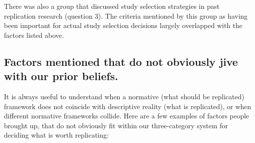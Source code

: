 \documentclass[
]{article}
\begin{document}
There was also a group that discussed study selection strategies in past
replication research (question 3). The criteria mentioned by this group
as having been important for actual study selection decisions largely
overlapped with the factors listed above.

\hypertarget{factors-mentioned-that-do-not-obviously-jive-with-our-prior-beliefs.}{%
\subsection{Factors mentioned that do not obviously jive with our prior
beliefs.}\label{factors-mentioned-that-do-not-obviously-jive-with-our-prior-beliefs.}}

It is always useful to understand when a normative (what should be
replicated) framework does not coincide with descriptive reality (what
is replicated), or when different normative frameworks collide. Here are
a few examples of factors people brought up, that do not obviously fit
within our three-category system for deciding what is worth replicating:
\end{document}
